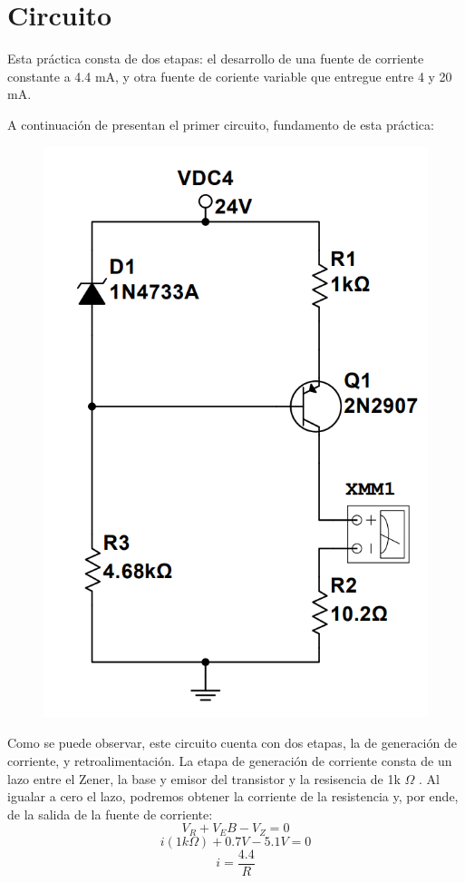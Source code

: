 \documentclass{article}
\begin{document}
\section{Circuito}
Esta práctica consta de dos etapas: el desarrollo de una fuente de corriente constante a 4.4 mA, y otra fuente
 de coriente variable que entregue entre 4 y 20 mA.

A continuación de presentan el primer circuito, fundamento de esta práctica:
\begin{figure}[h]
    \centering
    \includegraphics[scale=0.35]{Screenshot 2022-05-25 012610.png}
    \label{Fuente de corriente de 4.4 mA}
\end{figure}

Como se puede observar, este circuito cuenta con dos etapas, la de generación de corriente, y retroalimentación. La 
etapa de generación de corriente consta de un lazo entre el Zener, la base y emisor del transistor y la resisencia de 
1k \(\Omega\) . Al igualar a cero el lazo, podremos obtener la corriente de la resistencia y, por ende, de la salida de 
la fuente de corriente:
\[ V_R + V_EB - V_Z = 0 \]
\[ i(1k \Omega ) + 0.7V -5.1V = 0 \]
\[ i = \frac{4.4}{R} \]
\end{document}
